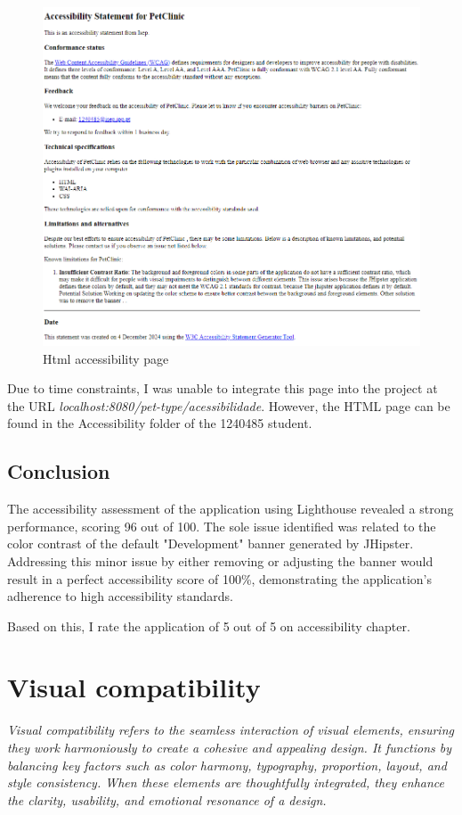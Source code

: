 \documentclass[a4paper,11pt,openright,BCOR=15mm]{scrbook}
\begin{document}
\begin{figure}[H]
	\centering
	\includegraphics[width=\textwidth]{figs/Accessibility/HTML page.png}
	\caption{Html accessibility page}
	\label{fig:Html Page}
\end{figure}
Due to time constraints, I was unable to integrate this page into the project at the URL \textit{localhost:8080/pet-type/acessibilidade}. However, the HTML page can be found in the Accessibility folder of the 1240485 student.
\section{Conclusion}
The accessibility assessment of the application using Lighthouse revealed a strong performance, scoring 96 out of 100. The sole issue identified was related to the color contrast of the default "Development" banner generated by JHipster. Addressing this minor issue by either removing or adjusting the banner would result in a perfect accessibility score of 100\%, demonstrating the application's adherence to high accessibility standards.


Based on this, I rate the application of 5 out of 5 on accessibility chapter.
\chapter{Visual compatibility}
\textit{Visual compatibility refers to the seamless interaction of visual elements, ensuring they work harmoniously to create a cohesive and appealing design. It functions by balancing key factors such as color harmony, typography, proportion, layout, and style consistency. When these elements are thoughtfully integrated, they enhance the clarity, usability, and emotional resonance of a design.}
\end{document}
